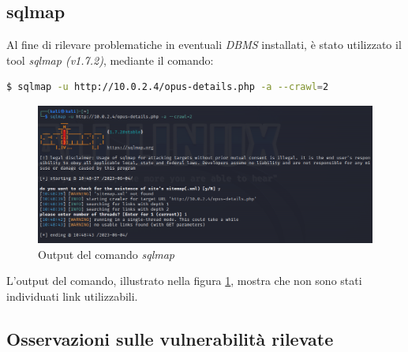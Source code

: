 \subsection{sqlmap}
Al fine di rilevare problematiche in eventuali \emph{DBMS} installati, è stato utilizzato il tool \emph{sqlmap (v1.7.2)}, mediante il comando:
\begin{lstlisting}[language=bash]
    $ sqlmap -u http://10.0.2.4/opus-details.php -a --crawl=2
\end{lstlisting}
\begin{figure}[h]
    \centering
    \includegraphics[scale=0.5]{capitoli/images/sqlmap.png}
    \caption{Output del comando \emph{sqlmap}}
    \label{fig:sqlmap}
\end{figure}
L'output del comando, illustrato nella figura \ref{fig:sqlmap}, mostra che non sono stati individuati link utilizzabili. 
\subsection{Osservazioni sulle vulnerabilità rilevate}